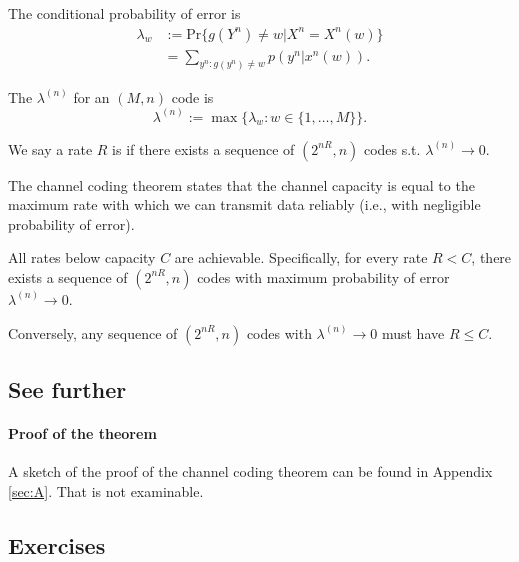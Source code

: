 \documentclass[a4paper, 11pt, openany]{book}
\begin{document}
    \begin{definition}
    The conditional probability of error is
    \begin{align*}
        \lambda_w &:= \mathrm{Pr}\{g(Y^n) \ne w | X^n = X^n(w)\}\\
        &= \sum_{y^n : g(y^n) \ne w} p(y^n | x^n(w)).
    \end{align*}

    The  $\lambda^{(n)}$ for an $(M,n)$ code is
    \[
        \lambda^{(n)} := \max \{\lambda_w : w \in \{1,\ldots,M\} \}.
    \]
    \end{definition}

    We say a rate $R$ is  if there exists a sequence of $(2^{nR}, n)$ codes s.t. $\lambda^{(n)} \to 0$.



    The channel coding theorem states that the channel capacity is equal to the maximum rate with which we can transmit data reliably (i.e., with negligible probability of error).

    \begin{theorem}
    All rates below capacity $C$ are achievable. Specifically, for every rate $R < C$, there exists a sequence of $(2^{nR}, n)$ codes with maximum probability of error $\lambda^{(n)} \to 0$.

    Conversely, any sequence of $(2^{nR}, n)$ codes with $\lambda^{(n)} \to 0$ must have $R \le C$.
    \end{theorem}











    \subsection{See further}

    \paragraph{Proof of the theorem} A sketch of the proof of the channel coding theorem can be found in Appendix \ref{sec:A}. That is not examinable.



    \subsection{Exercises}
\end{document}
